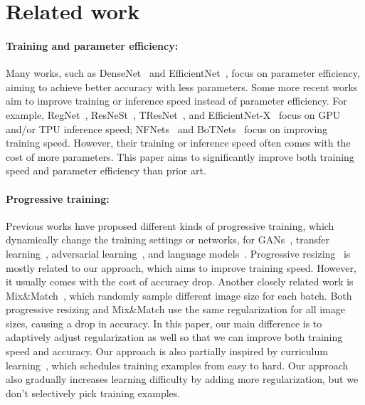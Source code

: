 \documentclass{article}
\begin{document}
\section{Related work}

\paragraph{Training and parameter efficiency:} Many works, such as DenseNet~\cite{densenet17} and EfficientNet~\cite{efficientnet19}, focus on parameter efficiency, aiming to achieve better accuracy with less parameters. Some more recent works aim to improve training or inference speed instead of parameter efficiency. For example, RegNet~\cite{regnet20}, ResNeSt~\cite{resnest20}, TResNet~\cite{tresnet20}, and EfficientNet-X~\cite{efficientnetx21} focus on GPU and/or TPU inference speed; NFNets~\cite{nfnet21} and BoTNets~\cite{botnet21} focus on improving training speed. However, their training or inference speed often comes with the cost of more parameters. This paper aims to significantly improve both training speed and parameter efficiency than prior art. 

\paragraph{Progressive training:} Previous works have proposed different kinds of progressive training, which dynamically change the training settings or networks, for GANs~\cite{progressivegan18}, transfer learning~\cite{progressivegan18}, adversarial learning~\cite{progressiveadv19}, and language models~\cite{shortformer21}. Progressive resizing~\cite{fastaidawnbench} is mostly related to our approach, which aims to improve training speed. However, it usually comes with the cost of accuracy drop. Another closely related work is Mix\&Match~\cite{mixmatch19}, which randomly sample different image size for each batch. Both progressive resizing and Mix\&Match use the same regularization for all image sizes, causing a drop in accuracy. In this paper, our main difference is to adaptively adjust regularization as well so that we can improve both training speed and accuracy. Our approach is also partially inspired by curriculum learning~\cite{curriculum09}, which schedules training examples from easy to hard. Our approach also gradually increases learning difficulty by adding more regularization, but we don't selectively pick training examples.
\end{document}
